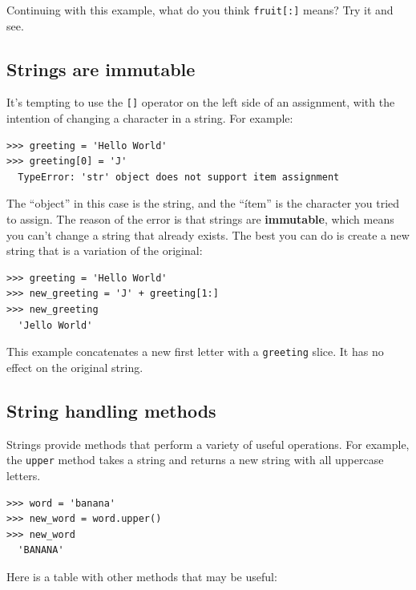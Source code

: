 Continuing with this example, what do you think \texttt{fruit[:]} means? Try it and see.


\subsection{Strings are immutable}

It's tempting to use the \texttt{[]} operator on the left side of an assignment, with the intention of changing a character in a string. For example:

\begin{Verbatim}[frame=single]
>>> greeting = 'Hello World'
>>> greeting[0] = 'J'
  TypeError: 'str' object does not support item assignment
\end{Verbatim}
%
The ``object'' in this case is the string, and the ``ítem'' is the character you tried to assign. The reason of the error is that strings are \textbf{immutable}, which means you can't change a string that already exists. The best you can do is create a new string that is a variation of the original:

\begin{Verbatim}[frame=single]
>>> greeting = 'Hello World'
>>> new_greeting = 'J' + greeting[1:]
>>> new_greeting
  'Jello World'
\end{Verbatim}
%
This example concatenates a new first letter with a \texttt{greeting} slice. It has no effect on the original string.


\subsection{String handling methods}

Strings provide methods that perform a variety of useful operations. For example, the \texttt{upper} method takes a string and returns a new string with all uppercase letters.


\begin{Verbatim}[frame=single]
>>> word = 'banana'
>>> new_word = word.upper()
>>> new_word
  'BANANA'
\end{Verbatim}

Here is a table with other methods that may be useful:

